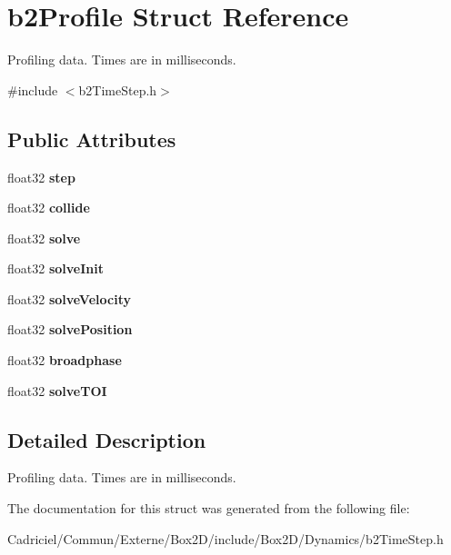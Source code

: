 \hypertarget{structb2_profile}{}\section{b2\+Profile Struct Reference}
\label{structb2_profile}


Profiling data. Times are in milliseconds.  




{\ttfamily \#include $<$b2\+Time\+Step.\+h$>$}

\subsection*{Public Attributes}
\begin{DoxyCompactItemize}
\item 
float32 {\bfseries step}\hypertarget{structb2_profile_a5b93de1d56902224868beacc478b9863}{}\label{structb2_profile_a5b93de1d56902224868beacc478b9863}

\item 
float32 {\bfseries collide}\hypertarget{structb2_profile_af827d9e54f7a4e94d0a023e18466b960}{}\label{structb2_profile_af827d9e54f7a4e94d0a023e18466b960}

\item 
float32 {\bfseries solve}\hypertarget{structb2_profile_afbefc05f05ec8bfd6cb2011929688a0b}{}\label{structb2_profile_afbefc05f05ec8bfd6cb2011929688a0b}

\item 
float32 {\bfseries solve\+Init}\hypertarget{structb2_profile_a010110900c27ccc88cd5e23b0e12e96e}{}\label{structb2_profile_a010110900c27ccc88cd5e23b0e12e96e}

\item 
float32 {\bfseries solve\+Velocity}\hypertarget{structb2_profile_ae4d29a19b38de81621bccdbf75595233}{}\label{structb2_profile_ae4d29a19b38de81621bccdbf75595233}

\item 
float32 {\bfseries solve\+Position}\hypertarget{structb2_profile_a78e22d104226863492ebab9ea30a9ed9}{}\label{structb2_profile_a78e22d104226863492ebab9ea30a9ed9}

\item 
float32 {\bfseries broadphase}\hypertarget{structb2_profile_a6bd556e43a6fa3853adad9fd71e56b44}{}\label{structb2_profile_a6bd556e43a6fa3853adad9fd71e56b44}

\item 
float32 {\bfseries solve\+T\+OI}\hypertarget{structb2_profile_a74e8ea0c6ca39250d639ec94b69a803e}{}\label{structb2_profile_a74e8ea0c6ca39250d639ec94b69a803e}

\end{DoxyCompactItemize}


\subsection{Detailed Description}
Profiling data. Times are in milliseconds. 

The documentation for this struct was generated from the following file\+:\begin{DoxyCompactItemize}
\item 
Cadriciel/\+Commun/\+Externe/\+Box2\+D/include/\+Box2\+D/\+Dynamics/b2\+Time\+Step.\+h\end{DoxyCompactItemize}
